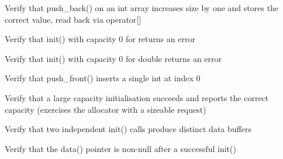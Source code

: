 \begin{DoxyRefList}
\item[Global \doxylink{test__array_8cpp_acdc58df79c2484cad25be1e9b3cf473d}{TEST\+\_\+F} (\doxylink{classArrayInitTest}{Array\+Init\+Test}, Push\+Back\+Int\+Single\+Element)]\label{test__test000013}%
%
Verify that push\+\_\+back() on an int array increases size by one and stores the correct value, read back via operator\mbox{[}\mbox{]}  
\item[Global \doxylink{test__array_8cpp_a5ba0a1765bbed581a07771041fa324e9}{TEST\+\_\+F} (\doxylink{classArrayInitTest}{Array\+Init\+Test}, Init\+Zero\+Capacity\+Point\+Returns\+Error)]\label{test__test000012}%
%
Verify that init() with capacity 0 for  returns an error  
\item[Global \doxylink{test__array_8cpp_a6ec6ed82228e132136524cf2dd88beaa}{TEST\+\_\+F} (\doxylink{classArrayInitTest}{Array\+Init\+Test}, Init\+Zero\+Capacity\+Double\+Returns\+Error)]\label{test__test000011}%
%
Verify that init() with capacity 0 for double returns an error  
\item[Global \doxylink{test__array_8cpp_ac3b369e74aee7075156eb6cbf306eddd}{TEST\+\_\+F} (\doxylink{classArrayInitTest}{Array\+Init\+Test}, Push\+Front\+Int\+Single\+Element)]\label{test__test000020}%
%
Verify that push\+\_\+front() inserts a single int at index 0  
\item[Global \doxylink{test__array_8cpp_aab1961ecafd10b6d6d7842781ad377f9}{TEST\+\_\+F} (\doxylink{classArrayInitTest}{Array\+Init\+Test}, Init\+Large\+Capacity\+Succeeds)]\label{test__test000009}%
%
Verify that a large capacity initialisation succeeds and reports the correct capacity (exercises the allocator with a sizeable request)  
\item[Global \doxylink{test__array_8cpp_a19498739023dd3028471e0e0307f8377}{TEST\+\_\+F} (\doxylink{classArrayInitTest}{Array\+Init\+Test}, Two\+Init\+Calls\+Produce\+Distinct\+Buffers)]\label{test__test000008}%
%
Verify that two independent init() calls produce distinct data buffers  
\item[Global \doxylink{test__array_8cpp_a883c74e4663d8870b286f7365c478f83}{TEST\+\_\+F} (\doxylink{classArrayInitTest}{Array\+Init\+Test}, Init\+Data\+Pointer\+Is\+Non\+Null)]\label{test__test000007}%
%
Verify that the data() pointer is non-\/null after a successful init()  
\item[Global \doxylink{test__array_8cpp_a1dee0a10627cca239df44baa52ef5dca}{TEST\+\_\+F} (\doxylink{classArrayInitTest}{Array\+Init\+Test}, Init\+Array\+Is\+Not\+Full)]\label{test__test000006}%

\end{DoxyRefList}
